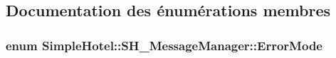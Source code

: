 \subsection{Documentation des énumérations membres}
\hypertarget{classSimpleHotel_1_1SH__MessageManager_aa33976e3103be652643d64f534b92274}{
\subsubsection[{Error\-Mode}]{\setlength{\rightskip}{0pt plus 5cm}enum {\bf Simple\-Hotel\-::\-S\-H\-\_\-\-Message\-Manager\-::\-Error\-Mode}}}\label{classSimpleHotel_1_1SH__MessageManager_aa33976e3103be652643d64f534b92274}
